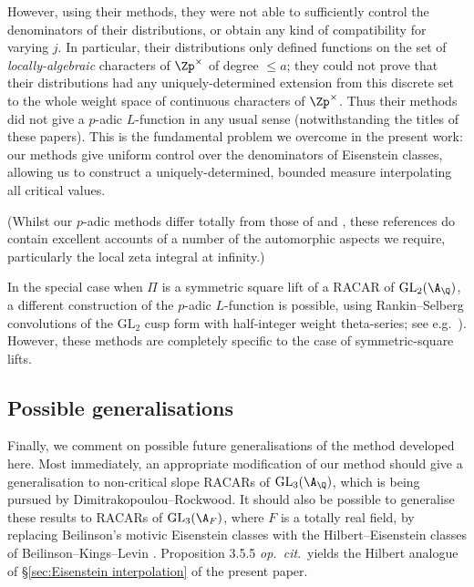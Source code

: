 \documentclass[10pt,reqno,a4paper]{amsart}
\newcommand{\GL}{\mathrm{GL}}
\begin{document}
However, using their methods, they were not able to sufficiently control the denominators of their distributions, or obtain any kind of compatibility for varying $j$. In particular, their distributions only defined functions on the set of \emph{locally-algebraic} characters of $\Zp^\times$ of degree $\le a$; they could not prove that their distributions had any uniquely-determined extension from this discrete set to the whole weight space of continuous characters of $\Zp^\times$. Thus their methods did not give a $p$-adic $L$-function in any usual sense (notwithstanding the titles of these papers). This is the fundamental problem we overcome in the present work: our methods give uniform control over the denominators of Eisenstein classes, allowing us to construct a uniquely-determined, bounded measure interpolating all critical values.

(Whilst our $p$-adic methods differ totally from those of \cite{Mah00} and \cite{Ger15}, these references do contain excellent accounts of a number of the automorphic aspects we require, particularly the local zeta integral at infinity.)

In the special case when $\Pi$ is a symmetric square lift of a RACAR of $\GL_2(\A_{\Q})$, a different construction of the $p$-adic $L$-function is possible, using Rankin--Selberg convolutions of the $\GL_2$ cusp form with half-integer weight theta-series; see e.g.~\cite{Sch88,Hid90,DD97}). However, these methods are completely specific to the case of symmetric-square lifts.




\subsection{Possible generalisations} Finally, we comment on possible future generalisations of the method developed here. Most immediately, an appropriate modification of our method should give a generalisation to non-critical slope RACARs of $\GL_3(\A_{\Q})$, which is being pursued by Dimitrakopoulou--Rockwood. It should also be possible to generalise these results to RACARs of $\GL_3(\A_F)$, where $F$ is a totally real field, by replacing Beilinson's motivic Eisenstein classes with the Hilbert--Eisenstein classes of Beilinson--Kings--Levin \cite{BKL14}. Proposition 3.5.5 \emph{op.\ cit}.\ yields the Hilbert analogue of \S\ref{sec:Eisenstein interpolation} of the present paper.
\end{document}

